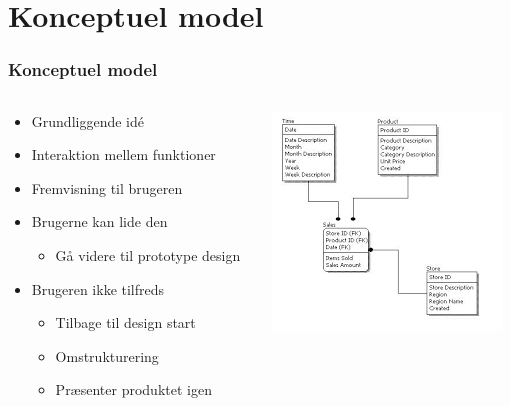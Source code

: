 \documentclass{beamer}
\begin{document}
\section{Konceptuel model}
\begin{frame}
\frametitle{Konceptuel model}
  \begin{columns}[T]
    \begin{column}{.5\textwidth}
	  \begin{itemize}
		\item Grundliggende idé
		\item Interaktion mellem funktioner
	    \item Fremvisning til brugeren
	    \item Brugerne kan lide den
	    \begin{itemize}
	      \item Gå videre til prototype design
	    \end{itemize}
	    \item Brugeren ikke tilfreds
	    \begin{itemize}
	      \item Tilbage til design start
	      \item Omstrukturering
	      \item Præsenter produktet igen
	    \end{itemize}
	  \end{itemize}
    \end{column}
    \begin{column}{.5\textwidth}
      \includegraphics[width=\textwidth]{conceptual.png}
    \end{column}
  \end{columns}
\end{frame}
\end{document}
